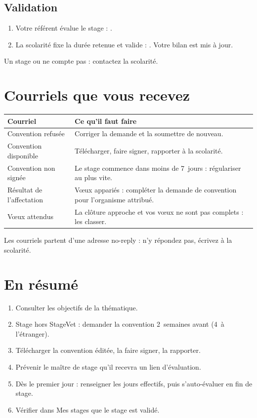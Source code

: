 \documentclass[11pt,a4paper]{article}
\begin{document}
\subsection{Validation}

\begin{enumerate}
  \item Votre référent évalue le stage : .
  \item La scolarité fixe la durée retenue et valide : .
        Votre bilan est mis à jour.
\end{enumerate}

Un stage  ou  ne compte pas : contactez la
scolarité.

\section{Courriels que vous recevez}

\begin{center}
\begin{tabularx}{\linewidth}{@{}l X@{}}
\toprule
\textbf{Courriel} & \textbf{Ce qu'il faut faire} \\
\midrule
Convention refusée & Corriger la demande et la soumettre de nouveau. \\
Convention disponible & Télécharger, faire signer, rapporter à la scolarité. \\
Convention non signée & Le stage commence dans moins de 7~jours : régulariser au plus vite. \\
Résultat de l'affectation & Vœux appariés : compléter la demande de convention pour l'organisme attribué. \\
Vœux attendus & La clôture approche et vos vœux ne sont pas complets : les classer. \\
\bottomrule
\end{tabularx}
\end{center}

Les courriels partent d'une adresse \og no-reply\fg{} : n'y répondez pas,
écrivez à la scolarité.

\section{En résumé}

\begin{enumerate}
  \item Consulter les objectifs de la thématique.
  \item Stage hors StageVet : demander la convention 2~semaines avant
        (4~à l'étranger).
  \item Télécharger la convention éditée, la faire signer, la rapporter.
  \item Prévenir le maître de stage qu'il recevra un lien d'évaluation.
  \item Dès le premier jour : renseigner les jours effectifs, puis
        s'auto-évaluer en fin de stage.
  \item Vérifier dans \og Mes stages\fg{} que le stage est validé.
\end{enumerate}
\end{document}
